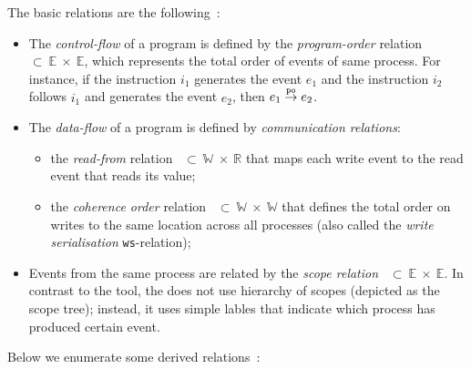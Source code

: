 \vspace{1em}
The basic relations are the following~\cite{alglave2010shared}:
\begin{itemize}
    \item The \textit{control-flow} of a program is defined by the \textit{program-order} relation \po~$\subset~\mathbb{E}~\times~\mathbb{E}$, which represents the total order of events of same process.
	For instance, if the instruction $i_1$ generates the event $e_1$ and the instruction $i_2$ follows $i_1$ and generates the event $e_2$, then $e_1 \overset{\mathtt{po}}{\rightarrow} e_2$.

    \item The \textit{data-flow} of a program is defined by \textit{communication relations}:
        \begin{itemize}[noitemsep]
            \item the \textit{read-from} relation \rf~$\subset~\mathbb{W}~\times~\mathbb{R}$ that maps each write event to the read event that reads its value;
            \item the \textit{coherence order} relation \co~$\subset~\mathbb{W}~\times~\mathbb{W}$ that defines the total order on writes to the same location across all processes         (also called the \textit{write serialisation} \texttt{ws}-relation);
        \end{itemize}

	\item Events from the same process are related by the \textit{scope relation} \sr~$\subset~\mathbb{E}~\times~\mathbb{E}$.
    In contrast to the  tool, the \porthos[2] does not use hierarchy of scopes (depicted as the scope tree); instead, it uses simple lables that indicate which process has produced certain event.
\end{itemize}


Below we enumerate some derived relations~\cite{alglave2010shared}:

